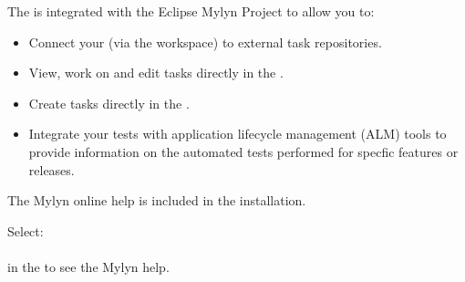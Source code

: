 The \ite{} is integrated with the Eclipse Mylyn Project to allow you to:
\begin{itemize}
\item Connect your \ite{} (via the workspace) to external task repositories.
\item View, work on and edit tasks directly in the \ite{}.
\item Create tasks directly in the \ite{}.
\item Integrate your tests with application lifecycle management (ALM) tools to provide information on the automated tests performed for specfic features or releases.
\end{itemize}

The Mylyn online help is included in the installation. 

Select:\\
 \\
in the \ite{} to see the Mylyn help. 
